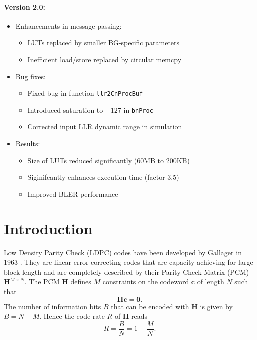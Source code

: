 \documentclass{article}
\def\0{\mathbf{0}}
\def\c{\mathbf{c}}
\def\H{\mathbf{H}}
\begin{document}
\paragraph{Version 2.0:}
\begin{itemize}
\item Enhancements in message passing:
  \begin{itemize}
  \item LUTs replaced by smaller BG-specific parameters
  \item Inefficient load/store replaced by circular memcpy
  \end{itemize}
\item Bug fixes:
  \begin{itemize}
  \item Fixed bug in function \texttt{llr2CnProcBuf}
  \item Introduced saturation to $-127$ in \texttt{bnProc}
  \item Corrected input LLR dynamic range in simulation
  \end{itemize}
\item Results:
  \begin{itemize}
  \item Size of LUTs reduced significantly (60MB to 200KB)
  \item Siginifcantly enhances execution time (factor 3.5)
  \item Improved BLER performance
  \end{itemize}
\end{itemize}


\newpage
\tableofcontents

\newpage
\section{Introduction}
\label{sec:introduction}

Low Density Parity Check (LDPC) codes have been developed by Gallager in 1963 \cite{gallager1962low}. They are linear error correcting codes that are capacity-achieving for large block length and are completely described by their Parity Check Matrix (PCM) $\H^{M\times N}$. The PCM $\H$ defines $M$ constraints on the codeword $\c$ of length $N$ such that
\begin{equation}
  \label{eq:29}
  \H\c = \0.
\end{equation}
The number of information bits $B$ that can be encoded with $\H$ is given by $B=N-M$. Hence the code rate $R$ of $\H$ reads
\begin{equation}
  \label{eq:37}
  R = \frac{B}{N} = 1-\frac{M}{N}.
\end{equation}
\end{document}
